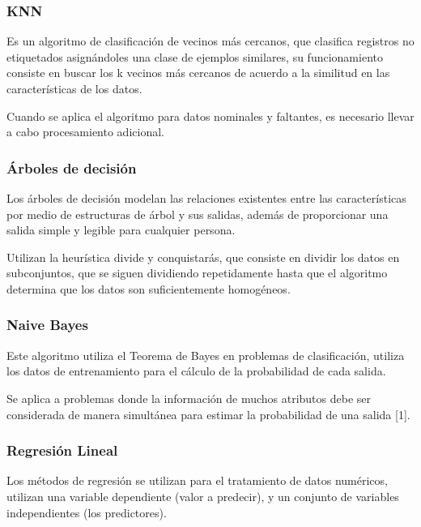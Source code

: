 \documentclass[]{article}
\begin{document}
\hypertarget{knn}{%
\subsubsection{KNN}\label{knn}}

Es un algoritmo de clasificación de vecinos más cercanos, que clasifica
registros no etiquetados asignándoles una clase de ejemplos similares,
su funcionamiento consiste en buscar los k vecinos más cercanos de
acuerdo a la similitud en las características de los datos.

Cuando se aplica el algoritmo para datos nominales y faltantes, es
necesario llevar a cabo procesamiento adicional.

\hypertarget{uxe1rboles-de-decisiuxf3n}{%
\subsubsection{Árboles de decisión}\label{uxe1rboles-de-decisiuxf3n}}

Los árboles de decisión modelan las relaciones existentes entre las
características por medio de estructuras de árbol y sus salidas, además
de proporcionar una salida simple y legible para cualquier persona.

Utilizan la heurística divide y conquistarás, que consiste en dividir
los datos en subconjuntos, que se siguen dividiendo repetidamente hasta
que el algoritmo determina que los datos son suficientemente homogéneos.

\hypertarget{naive-bayes}{%
\subsubsection{Naive Bayes}\label{naive-bayes}}

Este algoritmo utiliza el Teorema de Bayes en problemas de
clasificación, utiliza los datos de entrenamiento para el cálculo de la
probabilidad de cada salida.

Se aplica a problemas donde la información de muchos atributos debe ser
considerada de manera simultánea para estimar la probabilidad de una
salida {[}1{]}.

\hypertarget{regresiuxf3n-lineal}{%
\subsubsection{Regresión Lineal}\label{regresiuxf3n-lineal}}

Los métodos de regresión se utilizan para el tratamiento de datos
numéricos, utilizan una variable dependiente (valor a predecir), y un
conjunto de variables independientes (los predictores).
\end{document}
